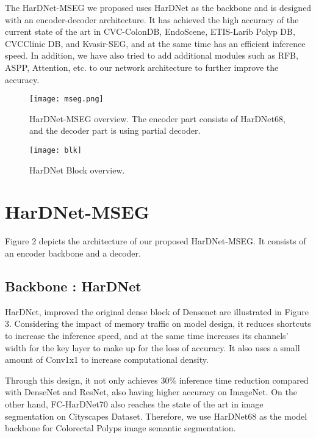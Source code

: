 \documentclass{article}
\begin{document}
    \vspace{4mm}
    The HarDNet-MSEG we proposed uses HarDNet\cite{chao2019hardnet} as the backbone and is designed with an encoder-decoder architecture. 
    It has achieved the high accuracy of the current state of the art in CVC-ColonDB,  EndoScene, ETIS-Larib Polyp DB, CVCClinic DB, and Kvasir-SEG, and at the same time has an efficient inference speed. 
    In addition, we have also tried to add additional modules such as RFB, ASPP, Attention, etc. to our network architecture to further improve the accuracy.
\newpage



\begin{figure}[htb]
\centering
\texttt{[image: mseg.png]}
\caption{
HarDNet-MSEG overview.
The encoder part consists of HarDNet68, 
and the decoder part is using partial decoder.}
\label{fig:HarDNet - MED}
\end{figure}

\begin{figure}[htb]
\centering
\texttt{[image: blk]}
\caption{HarDNet Block overview.}
\label{fig:hardblk}
\end{figure}

\section{HarDNet-MSEG}
    \vspace{4mm}
    \hspace*{0.5cm}Figure 2 depicts the architecture of our proposed HarDNet-MSEG. It consists of an encoder backbone and a decoder.
\subsection{Backbone : HarDNet}
    \vspace{4mm}
    \hspace*{0.5cm}HarDNet\cite{chao2019hardnet}, improved the original dense block of Densenet\cite{huang2017densely} are illustrated in Figure 3. Considering the impact of memory traffic on model design, it reduces shortcuts to increase the inference speed, and at the same time increases its channels’ width for the key layer to make up for the loss of accuracy. 
    It also uses a small amount of Conv1x1 to increase computational density. 

\vspace{4mm}
    Through this design, it not only achieves 30\% inference time reduction compared with DenseNet\cite{huang2017densely} and ResNet\cite{he2016deep}, also having higher accuracy on ImageNet\cite{deng2009imagenet}. 
    On the other hand, FC-HarDNet70\cite{huang2017densely} also reaches the state of the art in image segmentation on Cityscapes Dataset\cite{cordts2016cityscapes}. Therefore, we use HarDNet68 as the model backbone for Colorectal Polyps image semantic segmentation. 
\end{document}
